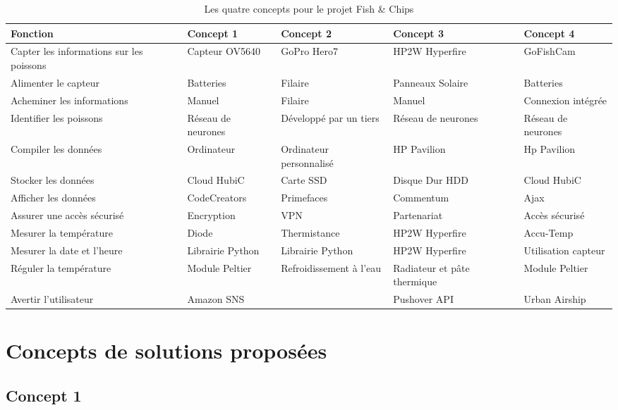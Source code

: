 \begin{table}[h]
    \centering
    \begin{tabular}{|p{3cm}|p{3cm}|p{2.5cm}|p{2.5cm}|p{2.5cm}|}
    \hline
    \textbf{Fonction} & \textbf{Concept 1} & \textbf{Concept 2} & \textbf{Concept 3} & \textbf{Concept 4}\\ \hline
    Capter les informations sur les poissons & Capteur OV5640 & GoPro Hero7 & HP2W Hyperfire & GoFishCam \\ \hline
    Alimenter le capteur & Batteries & Filaire & Panneaux Solaire & Batteries \\ \hline
    Acheminer les informations & Manuel & Filaire & Manuel & Connexion intégrée \\ \hline
    Identifier les poissons & Réseau de neurones & Développé par un tiers & Réseau de neurones & Réseau de neurones \\ \hline
    Compiler les données & Ordinateur  & Ordinateur personnalisé & HP Pavilion & Hp Pavilion\\ \hline
    Stocker les données & Cloud HubiC & Carte SSD & Disque Dur HDD & Cloud HubiC\\ \hline
    Afficher les données & CodeCreators & Primefaces & Commentum & Ajax\\ \hline
    Assurer une accès sécurisé & Encryption & VPN & Partenariat & Accès sécurisé\\ \hline
    Mesurer la température & Diode & Thermistance & HP2W Hyperfire & Accu-Temp\\ \hline
    Mesurer la date et l'heure & Librairie Python & Librairie Python & HP2W Hyperfire & Utilisation capteur \\ \hline
    Réguler la température & Module Peltier & Refroidissement à l'eau & Radiateur et pâte thermique & Module Peltier\\ \hline
    Avertir l'utilisateur & Amazon SNS &  & Pushover API & Urban Airship\\
    \hline
    \end{tabular}
    \caption{Les quatre concepts pour le projet Fish \& Chips}
    \label{tab:4_concepts}
\end{table}

\section{Concepts de solutions proposées}

\subsection{Concept 1}

